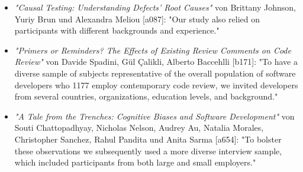 \begin{itemize}
    \item \textit{"Causal Testing: Understanding Defects’ Root Causes"} von Brittany Johnson, Yuriy Brun und Alexandra Meliou [a087]: "Our study also relied on participants with different backgrounds and experience."
    \item \textit{"Primers or Reminders? The Effects of Existing Review Comments on Code Review"} von Davide Spadini, Gül Çalikli, Alberto Baccehlli [b171]: "To have a diverse sample of subjects representative of the overall population of software developers who 1177 employ contemporary code review, we invited developers from several countries, organizations, education levels, and background."
    \item \textit{"A Tale from the Trenches: Cognitive Biases and Software Development"} von Souti Chattopadhyay, Nicholas Nelson, Audrey Au, Natalia Morales, Christopher Sanchez, Rahul Pandita und Anita Sarma [a654]: "To bolster these observations we subsequently used a more diverse interview sample, which included participants from both large and small employers."
\end{itemize}
